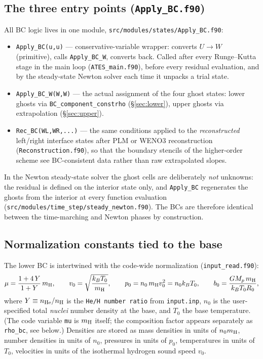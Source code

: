\documentclass[english,a4paper]{kiseon_memo}
\begin{document}
\subsection{The three entry points (\texttt{Apply\_BC.f90})}

All BC logic lives in one module,
\texttt{src/modules/states/Apply\_BC.f90}:

\begin{itemize}
\item \texttt{Apply\_BC(u,u)} --- conservative-variable wrapper:
  converts $U \to W$ (primitive), calls \texttt{Apply\_BC\_W}, converts
  back. Called after every Runge--Kutta stage in the main loop
  (\texttt{ATES\_main.f90}), before every residual evaluation, and
  by the steady-state Newton solver each time it unpacks a trial state.
\item \texttt{Apply\_BC\_W(W,W)} --- the actual assignment of the four
  ghost states: lower ghosts via \texttt{BC\_component\_constrho}
  (\S\ref{sec:lower}), upper ghosts via extrapolation
  (\S\ref{sec:upper}).
\item \texttt{Rec\_BC(WL,WR,...)} --- the same conditions applied to the
  \emph{reconstructed} left/right interface states after PLM or WENO3
  reconstruction (\texttt{Reconstruction.f90}), so that the boundary
  stencils of the higher-order scheme see BC-consistent data rather
  than raw extrapolated slopes.
\end{itemize}

In the Newton steady-state solver the ghost cells are deliberately
\emph{not} unknowns: the residual is defined on the interior state
only, and \texttt{Apply\_BC} regenerates the ghosts from the interior
at every function evaluation
(\texttt{src/modules/time\_step/steady\_newton.f90}). The BCs are
therefore identical between the time-marching and Newton phases by
construction.

\subsection{Normalization constants tied to the base}
\label{sec:normalization}

The lower BC is intertwined with the code-wide normalization
(\texttt{input\_read.f90}):
\begin{equation}
\mu = \frac{1 + 4\,Y}{1 + Y}\, m_{\rm H}, \qquad
v_0 = \sqrt{\frac{k_B T_0}{m_{\rm H}}}, \qquad
p_0 = n_0\, m_{\rm H} v_0^2 = n_0 k_B T_0, \qquad
b_0 = \frac{G M_p\, m_{\rm H}}{k_B T_0 R_0},
\end{equation}
where $Y \equiv n_{\rm He}/n_{\rm H}$ is the \texttt{He/H number
ratio} from \texttt{input.inp}, $n_0$ is the user-specified total
\emph{nuclei} number density at the base, and $T_0$ the base
temperature. (The code variable \texttt{mu} is $m_{\rm H}$ itself;
the composition factor appears separately as \texttt{rho\_bc}, see
below.) Densities are stored as mass densities in units of
$n_0 m_{\rm H}$, number densities in units of $n_0$, pressures in
units of $p_0$, temperatures in units of $T_0$, velocities in units of
the isothermal hydrogen sound speed $v_0$.
\end{document}
